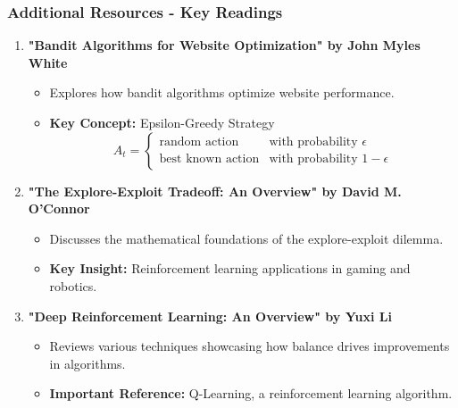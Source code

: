 \documentclass[aspectratio=169]{beamer}
\begin{document}
\begin{frame}[fragile]
    \frametitle{Additional Resources - Key Readings}

    \begin{enumerate}
        \item \textbf{"Bandit Algorithms for Website Optimization" by John Myles White}
            \begin{itemize}
                \item Explores how bandit algorithms optimize website performance.
                \item \textbf{Key Concept:} Epsilon-Greedy Strategy
                    \begin{equation}
                    A_t =
                    \begin{cases}
                    \text{random action} & \text{with probability } \epsilon \\
                    \text{best known action} & \text{with probability } 1 - \epsilon
                    \end{cases}
                    \end{equation}
            \end{itemize}
        
        \item \textbf{"The Explore-Exploit Tradeoff: An Overview" by David M. O'Connor}
            \begin{itemize}
                \item Discusses the mathematical foundations of the explore-exploit dilemma.
                \item \textbf{Key Insight:} Reinforcement learning applications in gaming and robotics.
            \end{itemize}
        
        \item \textbf{"Deep Reinforcement Learning: An Overview" by Yuxi Li}
            \begin{itemize}
                \item Reviews various techniques showcasing how balance drives improvements in algorithms.
                \item \textbf{Important Reference:} Q-Learning, a reinforcement learning algorithm.
            \end{itemize}
    \end{enumerate}
\end{frame}
\end{document}
